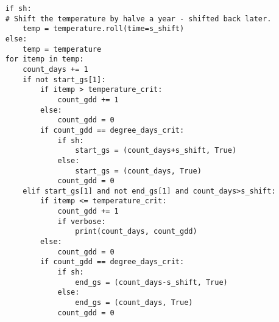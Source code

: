 \documentclass[manuscript]{copernicus}
\begin{document}
{\begin{verbatim}
    if sh:
    # Shift the temperature by halve a year - shifted back later.
        temp = temperature.roll(time=s_shift)
    else:
        temp = temperature
    for itemp in temp:
        count_days += 1
        if not start_gs[1]:
            if itemp > temperature_crit:
                count_gdd += 1
            else:
                count_gdd = 0
            if count_gdd == degree_days_crit:
                if sh:
                    start_gs = (count_days+s_shift, True)
                else:
                    start_gs = (count_days, True)
                count_gdd = 0
        elif start_gs[1] and not end_gs[1] and count_days>s_shift:
            if itemp <= temperature_crit:
                count_gdd += 1
                if verbose:
                    print(count_days, count_gdd)
            else:
                count_gdd = 0
            if count_gdd == degree_days_crit:
                if sh:
                    end_gs = (count_days-s_shift, True)
                else:
                    end_gs = (count_days, True)
                count_gdd = 0
       

\end{verbatim}}
\end{document}
